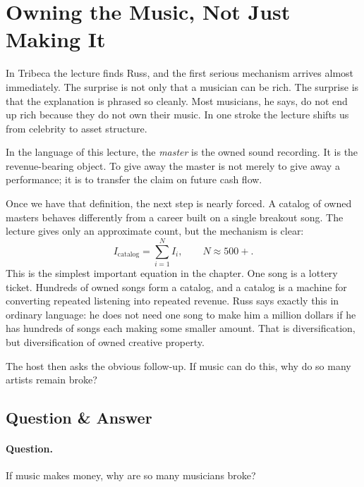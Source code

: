 \section{Owning the Music, Not Just Making It}

In Tribeca the lecture finds Russ, and the first serious mechanism arrives almost immediately. The surprise is not only that a musician can be rich. The surprise is that the explanation is phrased so cleanly. Most musicians, he says, do not end up rich because they do not own their music. In one stroke the lecture shifts us from celebrity to asset structure.

\begin{definition}
In the language of this lecture, the \emph{master} is the owned sound recording. It is the revenue-bearing object. To give away the master is not merely to give away a performance; it is to transfer the claim on future cash flow.
\end{definition}

Once we have that definition, the next step is nearly forced. A catalog of owned masters behaves differently from a career built on a single breakout song. The lecture gives only an approximate count, but the mechanism is clear:
\begin{equation}
I_{\mathrm{catalog}}=\sum_{i=1}^{N} I_i,\qquad N\approx 500+.
\end{equation}
This is the simplest important equation in the chapter. One song is a lottery ticket. Hundreds of owned songs form a catalog, and a catalog is a machine for converting repeated listening into repeated revenue. Russ says exactly this in ordinary language: he does not need one song to make him a million dollars if he has hundreds of songs each making some smaller amount. That is diversification, but diversification of owned creative property.

The host then asks the obvious follow-up. If music can do this, why do so many artists remain broke?

\subsection{Question \& Answer}

\paragraph{Question.} If music makes money, why are so many musicians broke?

